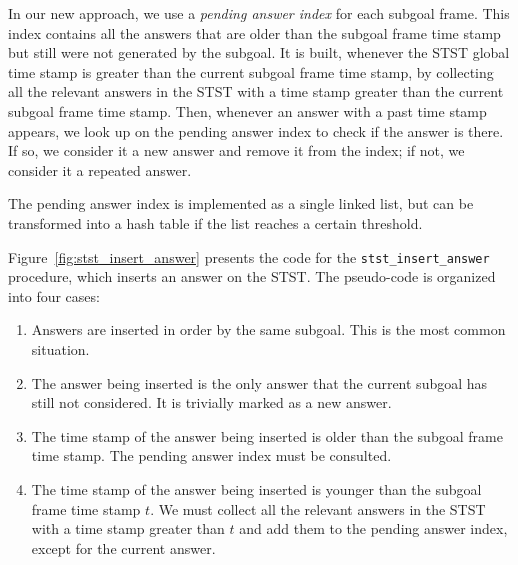 In our new approach, we use a \textit{pending answer index} for each subgoal frame.
This index contains all the answers that are older than the subgoal frame time stamp
but still were not generated by the subgoal. It is built, whenever the STST
global time stamp is greater than the current subgoal frame time stamp, by
collecting all the relevant answers in the STST with a time stamp greater than
the current subgoal frame time stamp. Then, whenever an answer with a past time stamp appears,
we look up on the pending answer index to check if the answer is there. If so,
we consider it a new answer and remove it from the index; if not, we consider it a repeated answer.

The pending answer index is implemented as a single linked list, but can be transformed
into a hash table if the list reaches a certain threshold.

Figure~\ref{fig:stst_insert_answer} presents the code for the \texttt{stst\_insert\_answer} procedure,
which inserts an answer on the STST. The pseudo-code is organized into four cases:

\begin{enumerate}
   \item Answers are inserted in order by the same subgoal. This is the most common situation.
   \item The answer being inserted is the only answer that the current subgoal has still not considered.
   It is trivially marked as a new answer.
   \item The time stamp of the answer being inserted is older than the subgoal frame time stamp.
   The pending answer index must be consulted.
   \item The time stamp of the answer being inserted is younger than the subgoal frame time stamp $t$.
   We must collect all the relevant answers in the STST with a time stamp greater than $t$
   and add them to the pending answer index, except for the current answer.
\end{enumerate}

